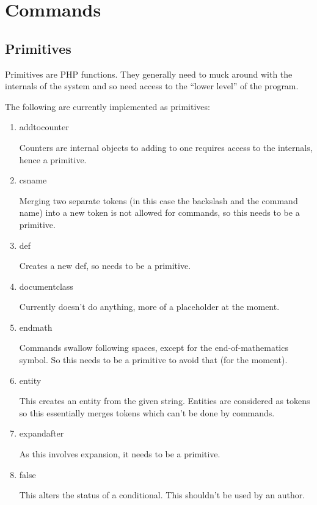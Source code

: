 \documentclass{webpage}
\begin{document}
\section{Commands}

\subsection{Primitives}

Primitives are PHP functions.
They generally need to muck around with the internals of the system and so need access to the ``lower level'' of the program.

The following are currently implemented as primitives:

\begin{enumerate}
\item addtocounter

Counters are internal objects to adding to one requires access to the internals, hence a primitive.

\item csname

Merging two separate tokens (in this case the backslash and the command name) into a new token is not allowed for commands, so this needs to be a primitive.

\item def

Creates a new def, so needs to be a primitive.

\item documentclass

Currently doesn't do anything, more of a placeholder at the moment.

\item endmath

Commands swallow following spaces, except for the end-of-mathematics symbol.
So this needs to be a primitive to avoid that (for the moment).

\item entity

This creates an entity from the given string.
Entities are considered as tokens so this essentially merges tokens which can't be done by commands.

\item expandafter

As this involves expansion, it needs to be a primitive.

\item false

This alters the status of a conditional.
This shouldn't be used by an author.


\end{enumerate}
\end{document}
